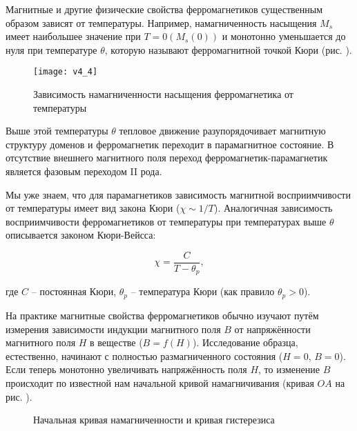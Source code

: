 Магнитные и другие физические свойства ферромагнетиков существенным образом зависят от температуры. Например, намагниченность насыщения $M_s$ имеет наибольшее значение при $T = 0 (M_s (0))$ и монотонно уменьшается до нуля при температуре $\theta$, которую называют ферромагнитной точкой Кюри (рис. ). 


\begin{wrapfigure}[]{r}{0.35\textwidth}
	\texttt{[image: v4\_4]}
	\caption{Зависимость намагниченности насыщения ферромагнетика от температуры}
\end{wrapfigure}
Выше  этой температуры $\theta$ тепловое движение разупорядочивает магнитную структуру доменов и ферромагнетик переходит в парамагнитное состояние. В отсутствие внешнего магнитного поля переход ферромагнетик-парамагнетик является фазовым переходом II рода.

Мы уже знаем, что для парамагнетиков зависимость магнитной восприимчивости от температуры имеет вид закона Кюри ($\chi \sim 1/T$). Аналогичная зависимость восприимчивости ферромагнетиков от температуры при температурах выше $\theta$ описывается законом Кюри-Вейсса:

\begin{equation*}
	\chi = \frac{C}{T - \theta_p},
\end{equation*}

где $C$ -- постоянная Кюри, $\theta_p$ -- температура Кюри (как правило $\theta_p > 0$).

На практике магнитные свойства ферромагнетиков обычно изучают путём измерения зависимости индукции магнитного поля $B$ от напряжённости магнитного поля $H$ в веществе ($B = f(H)$). Исследование образца, естественно, начинают с полностью размагниченного состояния ($H = 0$, $B = 0$). Если теперь монотонно увеличивать напряжённость поля $H$, то изменение $B$ происходит по известной нам начальной кривой намагничивания (кривая $OA$ на рис. ).


\begin{wrapfigure}{r}{0.4\textwidth}
	\caption{Начальная кривая намагниченности и кривая гистерезиса}
\end{wrapfigure}

